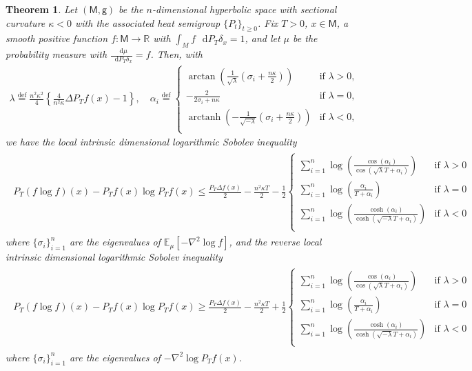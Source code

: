 \documentclass[a4paper,twoside,11pt,reqno]{amsart}
\newcommand{\eqdef}{\stackrel{\mathrm{def}}{=}}
\newtheorem{theorem}{Theorem}
\newcommand*\diff{\mathop{}\!\mathrm{d}}
\newcommand{\R}{\mathbb{R}} %
\DeclareMathOperator{\arctanh}{arctanh}
\newcommand{\MM}{\mathsf{M}}
\newcommand{\GG}{\mathsf{g}}
\newcommand{\mb}{\mathbb}
\begin{document}
\begin{theorem}
\label{thm:nge_curved}
Let $(\MM,\GG)$ be the $n$-dimensional hyperbolic space with sectional curvature $\kappa<0$ with the associated  heat semigroup $\{P_t\}_{t\ge 0}$. Fix $T>0$, $x\in\MM$, a smooth positive function $f:\MM\to\R$ with $\int_M f\,\diff P_T\delta_x=1$,
and let $\mu$ be the probability measure with $\frac{\diff\mu}{\diff P_T\delta_x}=f$. 
Then, with
\begin{align}
\lambda\eqdef \frac{n^2\kappa^2}{4}\left\{\frac{4}{n^2\kappa}\Delta P_Tf(x)-1\right\}, \quad 
\alpha_i\eqdef
\begin{cases}
\arctan\left(\frac{1}{\sqrt{\lambda}}\left(\sigma_i+\frac{n\kappa}{2}\right)\right)  &\text{if }\lambda>0,\\
-\frac{2}{2\sigma_i+n\kappa}  &\text{if }\lambda=0,\\
\arctanh\left(-\frac{1}{\sqrt{-\lambda}}\left(\sigma_i+\frac{n\kappa}{2}\right)\right)&\text{if }\lambda<0,\\
\end{cases}
\end{align}
we have the local intrinsic dimensional logarithmic Sobolev inequality
\begin{align} \label{eq:manifolds-lsi_nonpos}
\begin{split}
P_T(f\log f)(x)-P_Tf(x)\log P_Tf(x)\leq \frac{ P_T\Delta f(x)}{2}-\frac{n^2\kappa T}{2}-\frac{1}{2}
\begin{cases}
\sum_{i=1}^n\log\left(\frac{\cos (\alpha_i)}{\cos(\sqrt{\lambda}T+\alpha_i)}\right)&\text{if }\lambda>0\\
\sum_{i=1}^n\log\left(\frac{\alpha_i}{T+\alpha_i}\right) &\text{if }\lambda=0\\
\sum_{i=1}^n\log\left(\frac{\cosh (\alpha_i)}{\cosh(\sqrt{-\lambda}T+\alpha_i)}\right) &\text{if }\lambda<0\\
\end{cases}
\end{split}
\end{align}
where $\{\sigma_i\}_{i=1}^n$ are the eigenvalues of $\mb{E}_{\mu}[-\nabla^2\log f]$, and the reverse local intrinsic dimensional logarithmic Sobolev inequality
\begin{align} \label{eq:manifolds-rev-lsi_nonpos}
\begin{split}
P_T(f\log f)(x)-P_Tf(x)\log P_Tf(x)\geq \frac{ P_T\Delta f(x)}{2}-\frac{n^2\kappa T}{2}+\frac{1}{2}
\begin{cases}
\sum_{i=1}^n\log\left(\frac{\cos (\alpha_i)}{\cos(\sqrt{\lambda}T+\alpha_i)}\right)&\text{if }\lambda>0\\
\sum_{i=1}^n\log\left(\frac{\alpha_i}{T+\alpha_i}\right) &\text{if }\lambda=0\\
\sum_{i=1}^n\log\left(\frac{\cosh (\alpha_i)}{\cosh(\sqrt{-\lambda}T+\alpha_i)}\right) &\text{if }\lambda<0\\
\end{cases}
\end{split}
\end{align}
where $\{\sigma_i\}_{i=1}^n$ are the eigenvalues of $-\nabla^2\log P_Tf(x)$.
\end{theorem}
\end{document}
